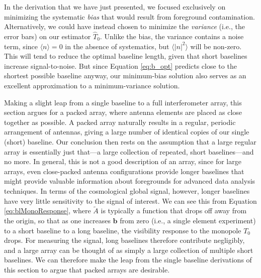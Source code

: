 \documentclass[twocolumn,apj,numberedappendix]{emulateapj}
\newcommand{\M}{\mathbf{M}}
\newcommand{\acl}[1]{}
\begin{document}
In the derivation that we have just presented, we focused exclusively on minimizing the systematic \emph{bias} that would result from foreground contamination.  Alternatively, we could have instead chosen to minimize the \emph{variance} (i.e., the error bars) on our estimator $\widehat{T}_0$.  Unlike the bias, the variance contains a noise term, since $\langle n \rangle = 0$ in the absence of systematics, but $\langle |n|^2 \rangle$ will be non-zero.  This will tend to reduce the optimal baseline length, given that short baselines increase signal-to-noise.  But since Equation \eqref{eq:b_opt} predicts close to the shortest possible baseline anyway, our minimum-bias solution also serves as an excellent approximation to a minimum-variance solution.

Making a slight leap from a single baseline to a full interferometer array, this section argues for a packed array, where antenna elements are placed as close together as possible. A packed array naturally results in a regular, periodic arrangement of antennas, giving a large number of identical copies of our single (short) baseline. Our conclusion then rests on the assumption that a large regular array is essentially just that---a large collection of repeated, short baselines---and no more. In general, this is not a good description of an array, since for large arrays, even close-packed antenna configurations provide longer baselines that might provide valuable information about foregrounds for advanced data analysis techniques. In terms of the cosmological global signal, however, longer baselines have very little sensitivity to the signal of interest. We can see this from Equation \eqref{eq:blMonoResponse}, where $\widetilde{A}$ is typically a function that drops off away from the origin, so that as one increases $\mathbf{b}$ from zero (i.e., a single element experiment) to a short baseline to a long baseline, the visibility response to the monopole $T_0$ drops. For measuring the signal, long baselines therefore contribute negligibly, and a large array can be thought of as simply a large collection of multiple short baselines. We can therefore make the leap from the single baseline derivations of this section to argue that packed arrays are desirable.
%
\end{document}
